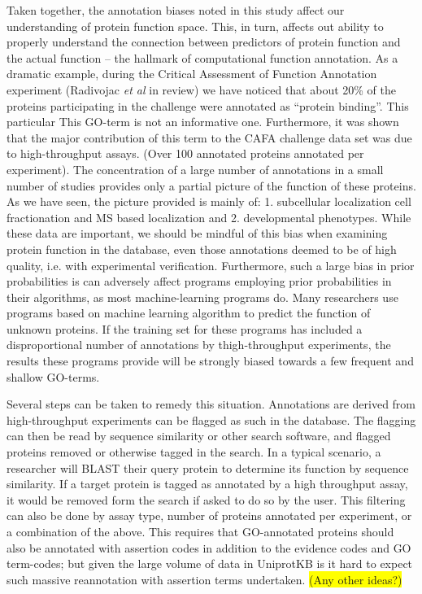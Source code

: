 \documentclass[12pt]{article}
\newcommand{\hilite}[1]{\colorbox{yellow}{#1}}
\begin{document}
Taken together, the annotation biases noted in this study affect our understanding of protein
function space. This, in turn, affects out ability to properly understand the connection between
predictors of protein function and the actual function -- the hallmark of computational function
annotation. As a dramatic example, during the Critical Assessment of Function Annotation
experiment (Radivojac \textit{et al} in review) we have noticed that about 20\% of the proteins
participating in the challenge were annotated as ``protein binding''. This particular This
GO-term is not an informative one. Furthermore, it was shown that the major contribution of this
term  to the CAFA challenge data set was due to high-throughput assays. (Over 100 annotated
proteins annotated per experiment). The concentration of a large number of annotations in a small
number of studies provides only a partial picture of the function of these proteins. As we have
seen, the picture provided is mainly of: 1. subcellular localization cell fractionation and MS
based localization and 2. developmental phenotypes. While these data are important, we should be
mindful of this bias when examining protein function in the database, even those annotations
deemed to be of high quality, i.e. with experimental verification. Furthermore, such a large
bias in prior probabilities is can adversely affect programs employing prior probabilities in
their algorithms, as most machine-learning programs do. Many researchers use programs based on
machine learning algorithm to predict the function of unknown proteins. If the training set for
these programs has included a disproportional number of annotations by thigh-throughput
experiments, the results these programs provide will be strongly biased towards a few frequent and
shallow GO-terms.

Several steps can be taken to remedy this situation. Annotations are derived from
high-throughput experiments can be flagged as such in the database. The flagging can then be
read by sequence similarity or other search software, and flagged proteins removed or
otherwise tagged in the search.  In a typical scenario, a researcher will BLAST their query
protein to determine its function by sequence similarity. If a target protein is tagged as
annotated by a high throughput assay, it would be removed form the search if asked to do so
by the user. This filtering can also be done by assay type, number of proteins annotated per
experiment, or a combination of the above. This requires that GO-annotated proteins should
also be annotated with assertion codes in addition to the evidence codes and GO term-codes;
but given the large volume of data in UniprotKB is it hard to expect such massive
reannotation with assertion terms undertaken. \hilite{(Any other ideas?)}
\end{document}
